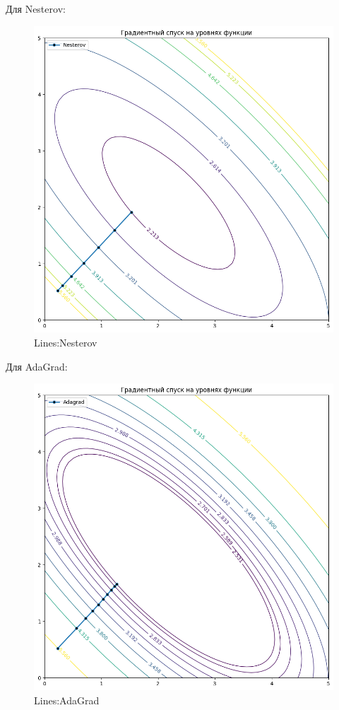 \documentclass[12pt, a4paper, oneside, final]{article}
\begin{document}
	Для Nesterov:
	\begin{figure}[H]
		\centering
		\includegraphics[scale = 0.6]{Image/T5_LINES_NESTEROV.png}
		\caption*{Lines:Nesterov}
	\end{figure}
	Для AdaGrad:
	\begin{figure}[H]
		\centering
		\includegraphics[scale = 0.6]{Image/T5_LINES_ADAGRAD.png}
		\caption*{Lines:AdaGrad}
	\end{figure}
\end{document}

